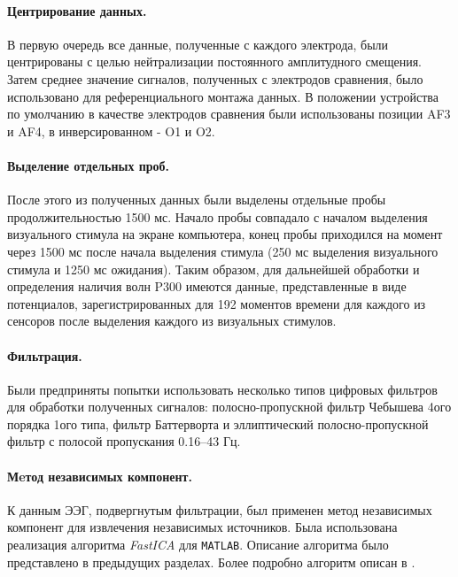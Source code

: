 \documentclass[12pt,a4paper,oneside,fleqn,leqno]{article}
\begin{document}
	\paragraph{Центрирование данных.}
	\par В первую очередь все данные, полученные с каждого электрода, были центрированы с целью нейтрализации постоянного амплитудного смещения. Затем среднее значение сигналов, полученных с электродов сравнения, было использовано для референциального монтажа данных. В положении устройства по умолчанию в качестве электродов сравнения были использованы позиции AF3 и AF4, в инверсированном - O1 и O2.
	\paragraph{Выделение отдельных проб.}
	\par После этого из полученных данных были выделены отдельные пробы продолжительностью 1500 мс. Начало пробы совпадало с началом выделения визуального стимула на экране компьютера, конец пробы приходился на момент через 1500 мс после начала выделения стимула (250 мс выделения визуального стимула и 1250 мс ожидания). Таким образом, для дальнейшей обработки и определения наличия волн P300 имеются данные, представленные в виде потенциалов, зарегистрированных для 192 моментов времени для каждого из сенсоров после выделения каждого из визуальных стимулов.
	\paragraph{Фильтрация.}
	\par Были предприняты попытки использовать несколько типов цифровых фильтров для обработки полученных сигналов: полосно-пропускной фильтр Чебышева 4ого порядка 1ого типа, фильтр Баттерворта и эллиптический полосно-пропускной фильтр с полосой пропускания 0.16--43 Гц.
	\paragraph{Мeтод независимых компонент.}
	\par К данным ЭЭГ, подвергнутым фильтрации, был применен метод независимых компонент для извлечения независимых источников. Была использована реализация алгоритма {\it FastICA} для {\tt MATLAB}. Описание алгоритма было представлено в предыдущих разделах. Более подробно алгоритм описан в \cite{FastICA}.
\end{document}

